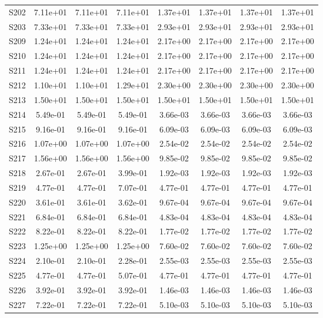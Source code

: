 {\begin{longtable}{l S[table-format=1.2e+2] S[table-format=1.2e+2] S[table-format=1.2e+2] S[table-format=1.2e+2] S[table-format=1.2e+2] S[table-format=1.2e+2] S[table-format=1.2e+2]}
S202 & 7.11e+01 & 7.11e+01 & 7.11e+01 & 1.37e+01 & 1.37e+01 & 1.37e+01 & 1.37e+01 \\
S203 & 7.33e+01 & 7.33e+01 & 7.33e+01 & 2.93e+01 & 2.93e+01 & 2.93e+01 & 2.93e+01 \\
S209 & 1.24e+01 & 1.24e+01 & 1.24e+01 & 2.17e+00 & 2.17e+00 & 2.17e+00 & 2.17e+00 \\
S210 & 1.24e+01 & 1.24e+01 & 1.24e+01 & 2.17e+00 & 2.17e+00 & 2.17e+00 & 2.17e+00 \\
S211 & 1.24e+01 & 1.24e+01 & 1.24e+01 & 2.17e+00 & 2.17e+00 & 2.17e+00 & 2.17e+00 \\
S212 & 1.10e+01 & 1.10e+01 & 1.29e+01 & 2.30e+00 & 2.30e+00 & 2.30e+00 & 2.30e+00 \\
S213 & 1.50e+01 & 1.50e+01 & 1.50e+01 & 1.50e+01 & 1.50e+01 & 1.50e+01 & 1.50e+01 \\
S214 & 5.49e-01 & 5.49e-01 & 5.49e-01 & 3.66e-03 & 3.66e-03 & 3.66e-03 & 3.66e-03 \\
S215 & 9.16e-01 & 9.16e-01 & 9.16e-01 & 6.09e-03 & 6.09e-03 & 6.09e-03 & 6.09e-03 \\
S216 & 1.07e+00 & 1.07e+00 & 1.07e+00 & 2.54e-02 & 2.54e-02 & 2.54e-02 & 2.54e-02 \\
S217 & 1.56e+00 & 1.56e+00 & 1.56e+00 & 9.85e-02 & 9.85e-02 & 9.85e-02 & 9.85e-02 \\
S218 & 2.67e-01 & 2.67e-01 & 3.99e-01 & 1.92e-03 & 1.92e-03 & 1.92e-03 & 1.92e-03 \\
S219 & 4.77e-01 & 4.77e-01 & 7.07e-01 & 4.77e-01 & 4.77e-01 & 4.77e-01 & 4.77e-01 \\
S220 & 3.61e-01 & 3.61e-01 & 3.62e-01 & 9.67e-04 & 9.67e-04 & 9.67e-04 & 9.67e-04 \\
S221 & 6.84e-01 & 6.84e-01 & 6.84e-01 & 4.83e-04 & 4.83e-04 & 4.83e-04 & 4.83e-04 \\
S222 & 8.22e-01 & 8.22e-01 & 8.22e-01 & 1.77e-02 & 1.77e-02 & 1.77e-02 & 1.77e-02 \\
S223 & 1.25e+00 & 1.25e+00 & 1.25e+00 & 7.60e-02 & 7.60e-02 & 7.60e-02 & 7.60e-02 \\
S224 & 2.10e-01 & 2.10e-01 & 2.28e-01 & 2.55e-03 & 2.55e-03 & 2.55e-03 & 2.55e-03 \\
S225 & 4.77e-01 & 4.77e-01 & 5.07e-01 & 4.77e-01 & 4.77e-01 & 4.77e-01 & 4.77e-01 \\
S226 & 3.92e-01 & 3.92e-01 & 3.92e-01 & 1.46e-03 & 1.46e-03 & 1.46e-03 & 1.46e-03 \\
S227 & 7.22e-01 & 7.22e-01 & 7.22e-01 & 5.10e-03 & 5.10e-03 & 5.10e-03 & 5.10e-03 \\

\end{longtable}}
